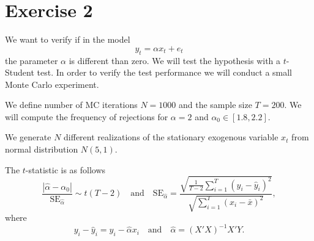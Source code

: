 \documentclass[12pt, a4paper]{article}\usepackage[]{graphicx}\usepackage[]{color}
\begin{document}
\section{Exercise 2}
We want to verify if in the model 
\[ y_t = \alpha x_t + e_t \]
the parameter $\alpha$ is different than zero. We will test the hypothesis with a $t$-Student test. In order to verify the test performance we will conduct a small Monte Carlo experiment.

We define number of MC iterations $N=1000$ and the sample size $T=200$. We will compute the frequency of rejections for $\alpha = 2$ and $\alpha_0 \in [1.8,2.2]$. 

We generate $N$ different realizations of the stationary exogenous variable $x_t$ from normal distribution $N(5,1)$.

The $t$-statistic is as follows
\[ 
  \frac{|\hat{\alpha} - \alpha_0|}{\text{SE}_{\hat{\alpha}}} \sim t(T-2)
  \quad\text{and}\quad
  \text{SE}_{\hat{\alpha}} = 
    \frac{\sqrt{ \frac{1}{T-2}  \sum_{i=1}^T (y_i - \hat{y}_i)^2}}
    {\sqrt{\sum_{i=1}^T (x_i - \bar{x})^2}},
\]
where
\[
  y_i - \hat{y}_i = y_i - \hat{\alpha}x_i
  \quad\text{and}\quad
  \hat{\alpha} = (X'X)^{-1} X' Y.
\]
\end{document}
